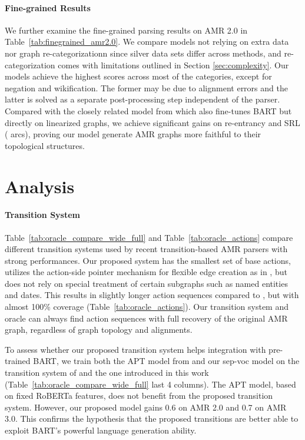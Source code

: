 \paragraph{Fine-grained Results}

We further examine the fine-grained parsing results on AMR 2.0 in Table~\ref{tab:finegrained_amr2.0}. We compare models not relying on extra data nor graph re-categorizationn since silver data sets differ across methods, and re-categorization comes with limitations outlined in Section \ref{sec:complexity}. Our models achieve the highest scores across most of the categories, except for negation and wikification. The former may be due to alignment errors and the latter is solved as a separate post-processing step independent of the parser. Compared with the closely related model from \citet{bevilacqua2021one} which also fine-tunes BART but directly on linearized graphs, we achieve significant gains on re-entrancy and SRL ( arcs), proving our
model generate AMR graphs more faithful to their topological structures.

\section{Analysis}
\label{sec:analysis}



\paragraph{Transition System}

Table~\ref{tab:oracle_compare_wide_full} and Table~\ref{tab:oracle_actions} compare different transition systems used by recent transition-based AMR parsers with strong performances. Our proposed system has the smallest set of base actions, utilizes the action-side pointer mechanism for flexible edge creation as in \citet{zhou2021amr}, but does not rely on special treatment of certain subgraphs such as named entities and dates. This results in slightly longer action sequences compared to \citet{zhou2021amr}, but with almost 100\% coverage\footnotemark{} (Table~\ref{tab:oracle_actions}).
Our transition system and oracle can always find action sequences with full recovery of the original AMR graph, regardless of graph topology and alignments.

To assess whether our proposed transition system helps integration with pre-trained BART,
we train both the APT model from \citet{zhou2021amr} and our sep-voc model on the transition system of \citet{zhou2021amr} and the one introduced in this work (Table~\ref{tab:oracle_compare_wide_full} last 4 columns). The APT model, based on fixed RoBERTa features, does not benefit from the proposed transition system. However, our proposed model gains 0.6 on AMR 2.0 and 0.7 on AMR 3.0. This confirms the hypothesis that the proposed transitions are better able to exploit BART's powerful language generation ability.


